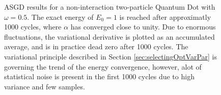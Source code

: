 \begin{figure}[h]
 \begin{center}
  \caption{ASGD results for a non-interaction two-particle Quantum Dot with $\omega=0.5$. The exact energy of $E_0=1$ is reached after approximatly 1000 cycles, where $\alpha$ has converged close to unity. Due to enormous fluctuations, the variational derivative is plotted as an accumulated average, and is in practice dead zero after 1000 cycles. The variational principle described in Section \ref{sec:selectingOptVarPar} is governing the trend of the energy convergence, however, alot of statistical noise is present in the first 1000 cycles due to high variance and few samples.}
  \label{fig:ASGD_nonint}
 \end{center}
\end{figure}



